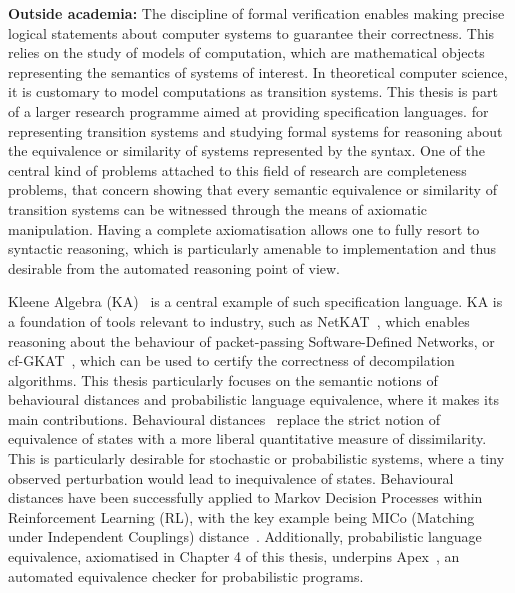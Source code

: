 \begin{impactstatement}
\textbf{Outside academia:} The discipline of formal verification enables making precise logical statements about computer systems to guarantee their correctness. This relies on the study of models of computation, which are mathematical objects representing the semantics of systems of interest. In theoretical computer science, it is customary to model computations as transition systems. This thesis is part of a larger research programme aimed at providing specification languages. for representing transition systems and studying formal systems for reasoning about the equivalence or similarity of systems represented by the syntax. One of the central kind of problems attached to this field of research are completeness problems, that concern showing that every semantic equivalence or similarity of transition systems can be witnessed through the means of axiomatic manipulation. Having a complete axiomatisation allows one to fully resort to syntactic reasoning, which is particularly amenable to implementation and thus desirable from the automated reasoning point of view. 

Kleene Algebra (KA)~\cite{Kozen:1994:Completeness} is a central example of such specification language. KA is a foundation of tools relevant to industry, such as NetKAT~\cite{Anderson:2014:NetKAT}, which enables reasoning about the behaviour of packet-passing Software-Defined Networks, or cf-GKAT~\cite{Zhang:2025:CFGKAT}, which can be used to certify the correctness of decompilation algorithms. This thesis particularly focuses on the semantic notions of behavioural distances and probabilistic language equivalence, where it makes its main contributions. Behavioural distances~\cite{Breugel:2001:Towards,Desharnais:2004:Metrics} replace the strict notion of equivalence of states with a more liberal quantitative measure of dissimilarity. This is particularly desirable for stochastic or probabilistic systems, where a tiny observed perturbation would lead to inequivalence of states. Behavioural distances have been successfully applied to Markov Decision Processes within Reinforcement Learning (RL), with the key example being MICo (Matching under Independent Couplings) distance~\cite{Castro:2021:MICo}. Additionally, probabilistic language equivalence, axiomatised in Chapter 4 of this thesis, underpins Apex~\cite{Kiefer:2012:APEX}, an automated equivalence checker for probabilistic programs.


\end{impactstatement}
